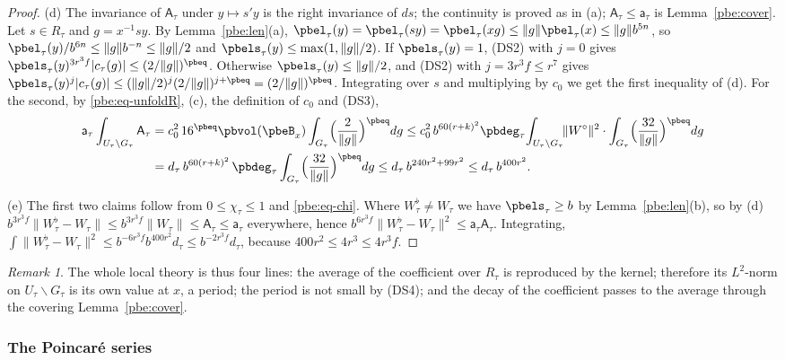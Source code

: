 \documentclass[10pt]{amsart}
\theoremstyle{definition}
\theoremstyle{remark}
\newtheorem{remark}[theorem]{Remark}
\begin{document}
\begin{proof}
(d) The invariance of $\mathsf A_\tau$ under $y\mapsto s'y$ is the right invariance of $ds$; the
continuity is proved as in (a); $\mathsf A_\tau\le\mathsf a_\tau$ is Lemma~\ref{pbe:cover}. Let $s\in
R_\tau$ and $g=x^{-1}sy$. By Lemma~\ref{pbe:len}(a), $\pbel_\tau(y)=\pbel_\tau(sy)=\pbel_\tau(xg)\le
\|g\|\pbel_\tau(x)\le\|g\|b^{5n}$, so $\pbel_\tau(y)/b^{6n}\le\|g\|b^{-n}\le\|g\|/2$ and
$\pbels_\tau(y)\le\max(1,\|g\|/2)$. If $\pbels_\tau(y)=1$,
\textup{(DS2)} with $j=0$ gives $\pbels_\tau(y)^{3r^3f}|c_\tau(g)|\le(2/\|g\|)^{\pbeq}$. Otherwise
$\pbels_\tau(y)\le\|g\|/2$, and \textup{(DS2)} with $j=3r^3f\le r^7$ gives $\pbels_\tau(y)^{j}|c_\tau(
g)|\le(\|g\|/2)^j(2/\|g\|)^{j+\pbeq}=(2/\|g\|)^{\pbeq}$. Integrating over $s$ and multiplying by
$c_0$ we get the first inequality of (d). For the second, by \eqref{pbe:eq-unfoldR}, (c), the
definition of $c_0$ and \textup{(DS3)},
\begin{align*}
\mathsf a_\tau\int_{U_\tau\backslash G_\tau}\mathsf A_\tau&=c_0^2\,16^{\pbeq}\pbvol(\pbeB_x)\int_{G_
\tau}\Bigl(\frac2{\|g\|}\Bigr)^{\pbeq}dg\le c_0^2\,b^{60(r+k)^2}\pbdeg_\tau\!\int_{U_\tau\backslash
G_\tau}\!\!\|W^\circ\|^2\cdot\int_{G_\tau}\Bigl(\frac{32}{\|g\|}\Bigr)^{\pbeq}dg\\
&=d_\tau\,b^{60(r+k)^2}\,\pbdeg_\tau\int_{G_\tau}\Bigl(\frac{32}{\|g\|}\Bigr)^{\pbeq}dg\le d_\tau\,
b^{240r^2+99r^2}\le d_\tau\,b^{400r^2}.
\end{align*}

(e) The first two claims follow from $0\le\chi_\tau\le1$ and \eqref{pbe:eq-chi}. Where $W_\tau^\flat
\ne W_\tau$ we have $\pbels_\tau\ge b$ by Lemma~\ref{pbe:len}(b), so by (d)
$b^{3r^3f}\|W_\tau^\flat-W_\tau\|\le b^{3r^3f}\|W_\tau\|\le\mathsf A_\tau\le\mathsf a_\tau$ everywhere,
hence $b^{6r^3f}\|W^\flat_\tau-W_\tau\|^2\le\mathsf a_\tau\mathsf A_\tau$. Integrating,
$\int\|W_\tau^\flat-W_\tau\|^2\le b^{-6r^3f}b^{400r^2}d_\tau\le b^{-2r^3f}d_\tau$, because $400r^2\le4r^3
\le4r^3f$.
\end{proof}

\begin{remark}\label{pbe:rem-local}
The whole local theory is thus four lines: the average of the coefficient over $R_\tau$ is
reproduced by the kernel; therefore its $L^2$-norm on $U_\tau\backslash G_\tau$ is its own value at
$x$, a period; the period is not small by \textup{(DS4)}; and the decay of the coefficient passes
to the average through the covering Lemma~\ref{pbe:cover}.
\end{remark}

\subsubsection{The Poincar\'e series}\label{pbe:ss-global}
\end{document}
